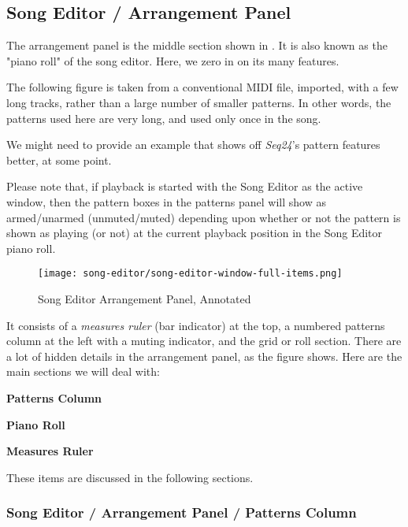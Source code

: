 \subsection{Song Editor / Arrangement Panel}
\label{subsec:seq24_song_editor_arrangement_panel}

   The arrangement panel is the middle section shown in
   .  It is also known as the
   "piano roll" of the song editor. Here, we zero in on its many
   features.

   The following figure is taken from a conventional MIDI file, imported,
   with a few long tracks, rather than a large number of smaller patterns.
   In other words, the patterns used here are very long, and used only once
   in the song.
   
   We might need to provide an example that shows off \textsl{Seq24}'s
   pattern features better, at some point.

   Please note that, if playback is started with the Song Editor as the
   active window, then the pattern boxes in the patterns panel will
   show as armed/unarmed (unmuted/muted) depending upon whether or not the
   pattern is shown as playing (or not) at the current playback position in
   the Song Editor piano roll.

\begin{figure}[H]
   \centering 
   \texttt{[image: song-editor/song-editor-window-full-items.png]}
   \caption{Song Editor Arrangement Panel, Annotated}
   \label{fig:song_editor_window_full_items}
\end{figure}

   It consists of a \textsl{measures ruler} (bar indicator) at the top, a
   numbered patterns column at the left with a muting indicator, and the
   grid or roll section.  There are a lot of hidden details in the
   arrangement panel, as the figure shows.  Here are the main sections we
   will deal with:

   \begin{enumber}
      \item \textbf{Patterns Column}
      \item \textbf{Piano Roll}
      \item \textbf{Measures Ruler}
   \end{enumber}

   These items are discussed in the following sections.

\subsubsection{Song Editor / Arrangement Panel / Patterns Column}
\label{subsubsec:seq24_song_editor_arrangement_panel_patterns_column}


